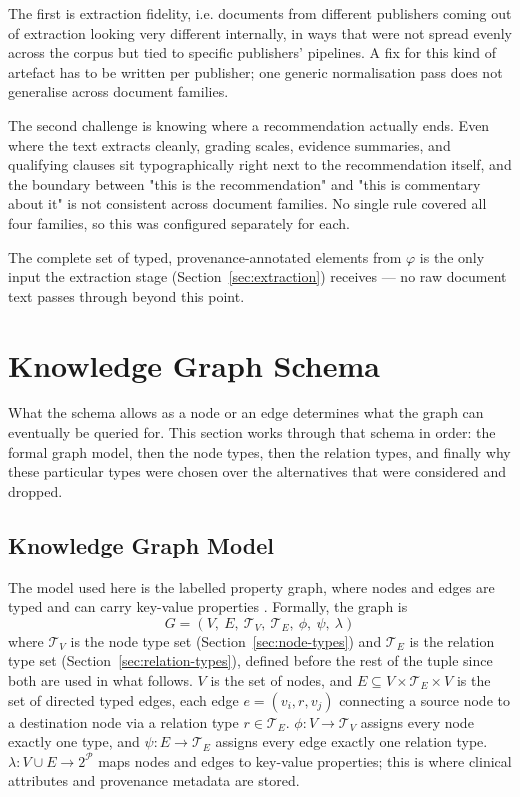 The first is extraction fidelity, i.e. documents from different publishers coming out of extraction looking very different internally, in ways that were not spread evenly across the corpus but tied to specific publishers' pipelines. A fix for this kind of artefact has to be written per publisher; one generic normalisation pass does not generalise across document families.

The second challenge is knowing where a recommendation actually ends. Even where the text extracts cleanly, grading scales, evidence summaries, and qualifying clauses sit typographically right next to the recommendation itself, and the boundary between "this is the recommendation" and "this is commentary about it" is not consistent across document families. No single rule covered all four families, so this was configured separately for each.

The complete set of typed, provenance-annotated elements from $\varphi$ is the only input the extraction stage (Section~\ref{sec:extraction}) receives --- no raw document text passes through beyond this point.

\section{Knowledge Graph Schema}
\label{sec:schema}

What the schema allows as a node or an edge determines what the graph can eventually be queried for. This section works through that schema in order: the formal graph model, then the node types, then the relation types, and finally why these particular types were chosen over the alternatives that were considered and dropped.

\subsection{Knowledge Graph Model}
\label{sec:graph-model}

The model used here is the labelled property graph, where nodes and edges are typed and can carry key-value properties \cite{hogan2021,hartig2014}. Formally, the graph is
\begin{equation}
G = (V,\ E,\ \mathcal{T}_V,\ \mathcal{T}_E,\ \phi,\ \psi,\ \lambda)
\label{eq:kg}
\end{equation}
where $\mathcal{T}_V$ is the node type set (Section~\ref{sec:node-types}) and $\mathcal{T}_E$ is the relation type set (Section~\ref{sec:relation-types}), defined before the rest of the tuple since both are used in what follows. $V$ is the set of nodes, and $E \subseteq V \times \mathcal{T}_E \times V$ is the set of directed typed edges, each edge $e = (v_i, r, v_j)$ connecting a source node to a destination node via a relation type $r \in \mathcal{T}_E$. $\phi: V \rightarrow \mathcal{T}_V$ assigns every node exactly one type, and $\psi: E \rightarrow \mathcal{T}_E$ assigns every edge exactly one relation type. $\lambda: V \cup E \rightarrow 2^{\mathcal{P}}$ maps nodes and edges to key-value properties; this is where clinical attributes and provenance metadata are stored.

